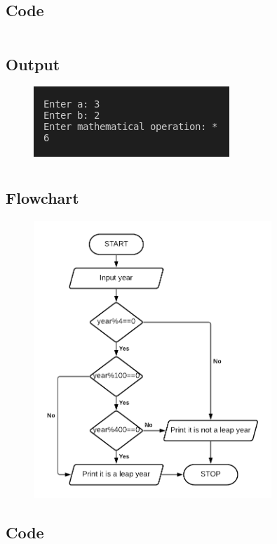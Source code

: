 \documentclass[12pt]{article}
\begin{document}
\subsection{Code}
\inputminted{c}{q1.c}
\subsection{Output}
\begin{figure}[h]
    \centering
    \includegraphics{1.png}
\end{figure}
\newpage
\section{}
\subsection{Flowchart}
\begin{figure}[h]
    \centering
    \includegraphics[width=0.8\textwidth]{Flowchart02.png}
\end{figure}
\newpage
\subsection{Code}
\inputminted{c}{q2.c}
\end{document}
